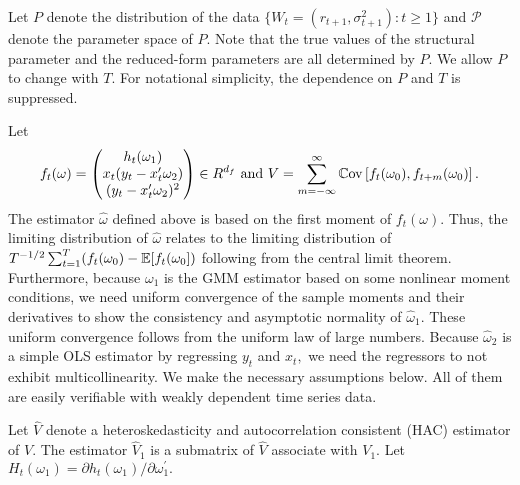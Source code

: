 Let $P$ denote the distribution of the data $\{W_{t}=(r_{t+1}, \sigma _{t+1}^{2}):t\geq 1\}$ and $\mathcal{P}$ denote the parameter space of $P$. Note that the true values of the structural parameter and the reduced-form parameters are all determined by $P.$ We allow $P$ to change with $T.$ For notational simplicity, the dependence on $P$ and $T$ is suppressed.

Let 
%
\begin{equation}
    f_{t}(\omega) = 
%
    \begin{pmatrix}
        h_{t}(\omega _{1}) \\ 
        x_{t}(y_{t}-x_{t}^{\prime }\omega _{2}) \\ 
        (y_{t}-x_{t}^{\prime }\omega _{2})^{2}%
    \end{pmatrix}
%
     \in R^{d_{f}}\text{ and } 
%
     V =\sum_{m=-\infty }^{\infty }\Cov\left[f_{t}(\omega _{0}),f_{t+m}(\omega _{0})\right].
\end{equation}
%
The estimator $\widehat{\omega }$ defined above is based on the first moment of $f_{t}(\omega ).$ Thus, the limiting distribution of $\widehat{\omega }$ relates to the limiting distribution of $T^{-1/2}\sum_{t=1}^{T}(f_{t}(\omega _{0})-\operatorname{\mathbb{E}}[f_{t}(\omega _{0}])$ following from the central limit theorem. Furthermore, because $\omega _{1}$ is the GMM estimator based on some nonlinear moment conditions, we need uniform convergence of the sample moments and their derivatives to show the consistency and asymptotic normality of $\widehat{\omega }_{1}.$ These uniform convergence follows from the uniform law of large numbers. Because $\widehat{\omega }_{2}$ is a simple OLS estimator by regressing $y_{t}$ and $x_{t},$ we need the regressors to not exhibit multicollinearity. We make the necessary assumptions below. All of them are easily verifiable with weakly dependent time series data.

Let $\widehat{V}$ denote a heteroskedasticity and autocorrelation consistent (HAC) estimator of $V$. The estimator $\widehat{V}_{1}$ is a submatrix of $\widehat{V}$ associate with $V_{1}.$ Let $H_{t}(\omega _{1})=\partial h_{t}(\omega _{1})/\partial \omega _{1}^{\prime }.$

